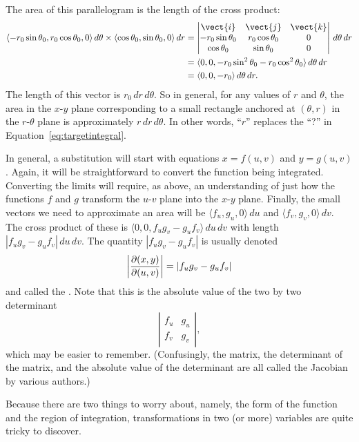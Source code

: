 The area of this parallelogram is the length of the cross product:
\begin{align*}
\langle -r_0\sin\theta_0, r_0\cos\theta_0, 0\rangle\,d\theta\times\langle\cos\theta_0, \sin\theta_0, 0\rangle\,dr
&= \left|\begin{matrix}	\vect{i}			&	\vect{j}		&	\vect{k}	\\
						-r_0\sin\theta_0	&	r_0\cos\theta_0	&	0			\\
						\cos\theta_0		&	\sin\theta_0	&	0
		 \end{matrix}\right|\,d\theta\,dr	\\
&=\langle 0,0,-r_0\sin^2\theta_0-r_0\cos^2\theta_0\rangle\,d\theta\,dr	\\
&=\langle 0,0,-r_0\rangle\,d\theta\,dr.
\end{align*}
The length of this vector is $r_0\,dr\,d\theta$. So in general, for
any values of $r$ and $\theta$, the area in the $x$-$y$ plane
corresponding to a small rectangle anchored at $(\theta,r)$ in the
$r$-$\theta$ plane is approximately $r\,dr\,d\theta$. In other words, ``$r$''
replaces the ``?'' in Equation~\ref{eq:targetintegral}.

In general, a substitution will start with equations $x=f(u,v)$ and
$y=g(u,v)$. Again, it will be straightforward to convert the function
being integrated. Converting the limits will require, as above, an
understanding of just how the functions $f$ and $g$ transform the
$u$-$v$ plane into the $x$-$y$ plane. Finally, the small vectors we
need to approximate an area will be
$\langle f_u,g_u,0\rangle\,du$ and $\langle f_v,g_v,0\rangle\,dv$.
The cross product of these is $\langle
0,0,f_ug_v-g_uf_v\rangle\,du\,dv$ with length 
$|f_ug_v-g_uf_v|\,du\,dv$. The quantity $|f_ug_v-g_uf_v|$ is usually
denoted
$$\left|{\partial(x,y)\over\partial(u,v)}\right|=|f_ug_v-g_uf_v|$$
and called the .
Note that this is the absolute value of the two by two determinant
\[\left|\begin{matrix}	f_u	&	g_u	\\
						f_v	&	g_v
		\end{matrix}\right|,\]
which may be easier to remember. (Confusingly, the matrix, the
determinant of the matrix, and the absolute value of the determinant
are all called the Jacobian by various authors.)

Because there are two things to worry about, namely, the form of the
function and the region of integration, transformations in two (or
more) variables are quite tricky to discover.

